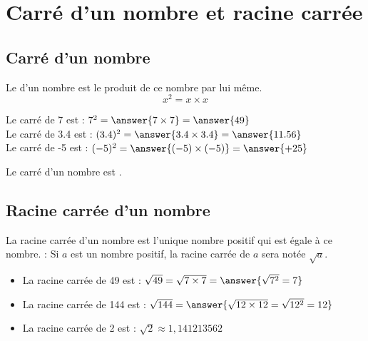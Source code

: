 \section{Carré d'un nombre et racine carrée}
\subsection{Carré d'un nombre}

\begin{definitionbox}
Le  d'un nombre est le produit de ce nombre par lui même.
$$x^2 = x \times x$$
\end{definitionbox}

\begin{exemplebox}
Le carré de 7 est : $ 7^2 = \answer{7\times 7} = \answer{49}$\\
Le carré de 3.4 est : $ (3.4)^2 = \answer{3.4 \times 3.4} = \answer{11.56}$\\
    Le carré de -5 est : $ (-5)^2 = \answer{(-5) \times (-5)} = \answer{+25}$
\end{exemplebox}

\begin{propbox}
    Le carré d'un nombre est . 
\end{propbox}

\subsection{Racine carrée d'un nombre}


\begin{definitionbox}
    La racine carrée d'un nombre  est l'unique nombre positif qui 
    est égale à ce nombre. 
    \newline
    \newline
     : Si $a$ est un nombre positif, la racine carrée
    de $a$ sera notée $\sqrt{a}$.
\end{definitionbox}

\begin{exemplebox}
    \begin{itemize}
        \item La racine carrée de 49 est : $ \sqrt{49} =\sqrt{7\times 7}=
            \answer{\sqrt{7^2} = 7}$
        \item La racine carrée de 144 est : $ \sqrt{144} = \answer{\sqrt{12
            \times 12} = \sqrt{12^2} = 12}$
        \item La racine carrée de 2 est : $ \sqrt{2} \approx 1,141213562$
    \end{itemize}
\end{exemplebox}

